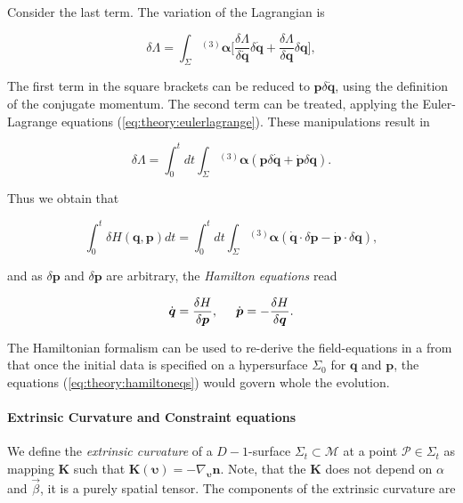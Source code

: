 Consider the last term. The variation of the Lagrangian is

\begin{equation}
\delta\Lambda = \int_{\Sigma}{^{(3)}\boldsymbol{\alpha}}\Bigg[\frac{\delta\Lambda}{\delta\dot{\boldsymbol{q}}}\delta\dot{\boldsymbol{q}}+\frac{\delta\Lambda}{\delta\boldsymbol{q}}\delta\boldsymbol{q}\Bigg],
\end{equation}

The first term in the square brackets can be reduced to $\boldsymbol{p}\delta\dot{\boldsymbol{q}}$, using the definition of the conjugate momentum. 
The second term can be treated, applying the Euler-Lagrange equations (\ref{eq:theory:eulerlagrange}). 
These manipulations result in

\begin{equation}
\delta\Lambda = \int_{0}^{t}dt\int_{\Sigma}{^{(3)}\boldsymbol{\alpha}}(\boldsymbol{p}\delta\dot{\boldsymbol{q}} + \dot{\boldsymbol{p}}\delta\boldsymbol{q}).
\end{equation}

Thus we obtain that 

\begin{equation}
\int_{0}^{t} \delta H(\boldsymbol{q},\boldsymbol{p})dt =   \int_{0}^{t}dt\int_{\Sigma}{^{(3)}\boldsymbol{\alpha}}(\dot{\boldsymbol{q}}\cdot\delta\boldsymbol{p}-\dot{\boldsymbol{p}}\cdot\delta\boldsymbol{q}),
\end{equation}

and as $\delta\boldsymbol{p}$ and $\delta\boldsymbol{p}$ are arbitrary, the \textit{Hamilton equations} read

\begin{equation}
\dot{\boldsymbol{q}}=\frac{\delta H}{\delta\boldsymbol{p}}, \hspace{5mm} \dot{\boldsymbol{p}} = -\frac{\delta H}{\delta\boldsymbol{q}}.
\label{eq:theory:hamiltoneqs}
\end{equation}

The Hamiltonian formalism can be used to re-derive the field-equations in a from that once the initial data is specified on a hypersurface $\Sigma_0$ for $\boldsymbol{q}$ and $\boldsymbol{p}$, the equations (\ref{eq:theory:hamiltoneqs}) would govern whole the evolution.


\paragraph{Extrinsic Curvature and Constraint equations}


We define the \textit{extrinsic curvature} of a $D-1$-surface $\Sigma_t\subset\mathcal{M}$ at a point $\mathcal{P}\in\Sigma_t$ as mapping $\boldsymbol{K}$ such that $\boldsymbol{K}(\boldsymbol{\upsilon})=-\nabla_{\boldsymbol{\upsilon}}\boldsymbol{n}$. 
Note, that the $\boldsymbol{K}$ does not depend on $\alpha$ and $\vec{\beta}$, it is a purely spatial tensor. 
The components of the extrinsic curvature are 

